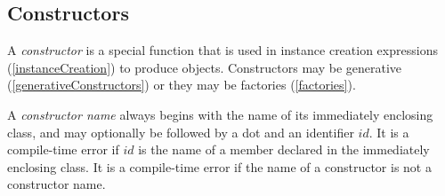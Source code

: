 \documentclass{article}
\newcommand{\code}[1]{{\sf #1}}
\begin{document}














\subsection{Constructors}

\LMHash{}
A {\em constructor} is a special function that is used in instance creation expressions (\ref{instanceCreation}) to produce objects. Constructors may be generative (\ref{generativeConstructors}) or they may be factories (\ref{factories}).

\LMHash{}
A {\em constructor name} always begins with the name of its immediately enclosing class, and may optionally be followed by a dot and an identifier $id$. It is a compile-time error if $id$ is the name of a member  declared in the immediately enclosing class. It is a compile-time error if the name of a  constructor is not a constructor name.
\end{document}
